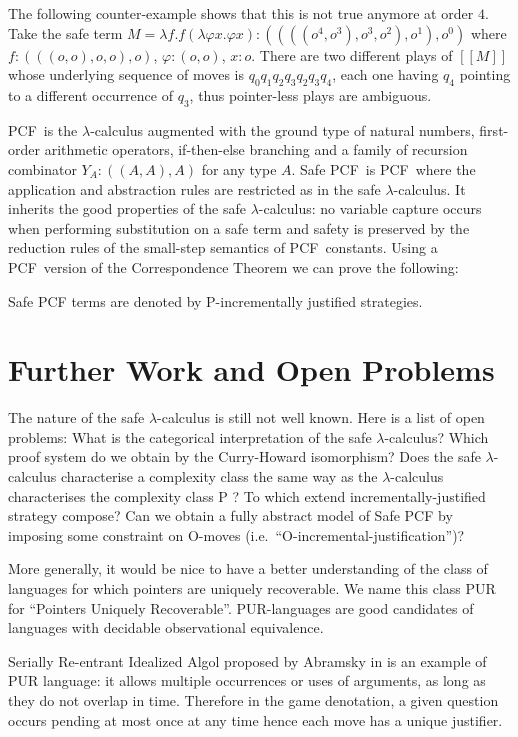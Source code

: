 \documentclass{llncs}
\newcommand{\sem}[1]{{[\![ #1 ]\!]}}
\newcommand\pcf{\textsf{PCF}}
\begin{document}
The following counter-example shows that this is not true anymore at order $4$. Take the safe term $M = \lambda f . f (\lambda \varphi x . \varphi x) : ((((o^4,o^3),o^{3},o^2),o^1),o^0)$ where $f:(((o,o),o,o),o)$, $\varphi:(o,o)$, $x:o$. There are two different plays of $\sem{M}$ whose underlying sequence of moves is $q_0 q_1 q_2 q_3 q_2 q_3 q_4$, each one having $q_4$ pointing to a different occurrence of $q_3$, thus pointer-less plays are ambiguous.


\pcf\ is the $\lambda$-calculus augmented with the ground type of natural numbers, first-order arithmetic operators, if-then-else branching
and a family of recursion combinator $Y_A : ((A,A),A)$ for any type $A$.
Safe \pcf\ is \pcf\ where the application and abstraction rules are restricted as in the safe $\lambda$-calculus.
It inherits the good properties of the safe $\lambda$-calculus: no variable capture occurs when performing substitution on a safe term and safety is preserved by the reduction rules of the small-step semantics of \pcf\ constants. Using a \pcf\ version of the Correspondence Theorem we can prove the following:
\begin{theorem}
\label{thm:safepcfpincr}
Safe PCF terms are denoted by P-incrementally justified strategies.
\end{theorem}


\section{Further Work and Open Problems}

The nature of the safe $\lambda$-calculus is still not well known. Here is a list of open problems:
What is the categorical interpretation of the safe $\lambda$-calculus? Which proof system do we obtain by the Curry-Howard isomorphism? Does the safe $\lambda$-calculus characterise a complexity class the same way as the $\lambda$-calculus characterises the complexity class P \cite{DBLP:conf/tlca/LeivantM93}?
To which extend incrementally-justified strategy compose? Can we obtain a fully abstract model of Safe PCF by imposing some constraint on O-moves (i.e.\ ``O-incremental-justification'')?

More generally, it would be nice to have a better understanding of the class of languages for which pointers are uniquely recoverable. We name this class PUR for ``Pointers Uniquely Recoverable''. PUR-languages are good candidates of languages with decidable observational equivalence.

Serially Re-entrant Idealized Algol proposed by Abramsky  in \cite{abramsky:mchecking_ia} is an example of PUR language: it allows multiple occurrences or uses of arguments, as long as they do not overlap in time. Therefore in the game denotation, a given question occurs pending at most once at any time hence each move has a unique justifier.
\end{document}
